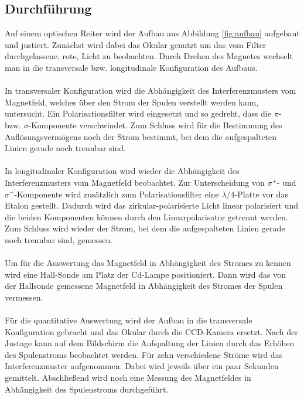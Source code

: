 \subsection{Durchführung}
Auf einem optischen Reiter wird der Aufbau aus Abbildung \ref{fig:aufbau} aufgebaut und justiert. Zunächst wird dabei das Okular genutzt um das vom Filter durchgelassene, rote, Licht zu beobachten. Durch Drehen des Magnetes wechselt man in die transversale bzw. longitudinale Konfiguration des Aufbaus. \\ \\
In transversaler Konfiguration wird die Abhängigkeit des Interferenzmusters vom Magnetfeld, welches über den Strom der Spulen verstellt werden kann, untersucht. Ein Polarisationsfilter wird eingesetzt und so gedreht, dass die $\pi$- bzw. $\sigma$-Komponente verschwindet. Zum Schluss wird für die Bestimmung des Auflösungsvermögens noch der Strom bestimmt, bei dem die aufgespalteten Linien gerade noch trennbar sind.\\ \\
In longitudinaler Konfiguration wird wieder die Abhängigkeit des Interferenzmusters vom Magnetfeld beobachtet. Zur Unterscheidung von $\sigma^+$- und $\sigma^-$-Komponente wird zusätzlich zum Polarisationsfilter eine $\lambda/4$-Platte vor das Etalon gestellt. Dadurch wird das zirkular-polarisierte Licht linear polarisiert und die beiden Komponenten können durch den Linearpolarisator getrennt werden. Zum Schluss wird wieder der Strom, bei dem die aufgespalteten Linien gerade noch trennbar sind, gemessen. \\ \\
Um für die Auswertung das Magnetfeld in Abhängigkeit des Stromes zu kennen wird eine Hall-Sonde am Platz der Cd-Lampe positioniert. Dann wird das von der Hallsonde gemessene Magnetfeld in Abhängigkeit des Stromes der Spulen vermessen.\\ \\
Für die quantitative Auswertung wird der Aufbau in die transversale Konfiguration gebracht und das Okular durch die CCD-Kamera ersetzt. Nach der Justage kann auf dem Bildschirm die Aufspaltung der Linien durch das Erhöhen des Spulenstroms beobachtet werden. Für zehn verschiedene Ströme wird das Interferenzmuster aufgenommen. Dabei wird jeweils über ein paar Sekunden gemittelt. Abschließend wird noch eine Messung des Magnetfeldes in Abhängigkeit des Spulenstroms durchgeführt. 

